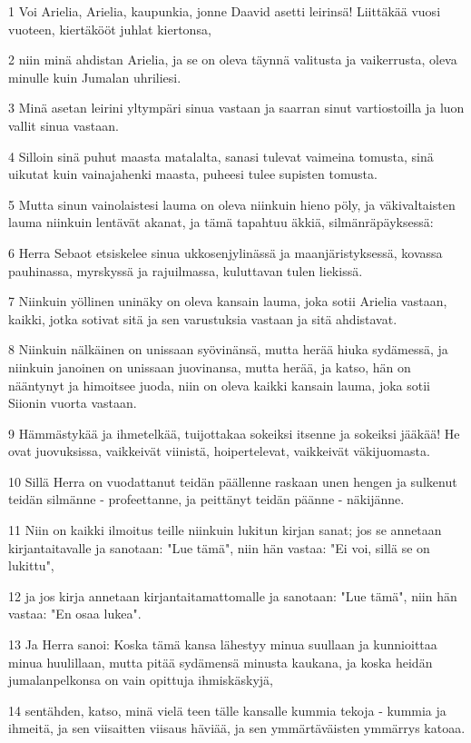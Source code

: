 \par 1 Voi Arielia, Arielia, kaupunkia, jonne Daavid asetti leirinsä! Liittäkää vuosi vuoteen, kiertäkööt juhlat kiertonsa,
\par 2 niin minä ahdistan Arielia, ja se on oleva täynnä valitusta ja vaikerrusta, oleva minulle kuin Jumalan uhriliesi.
\par 3 Minä asetan leirini yltympäri sinua vastaan ja saarran sinut vartiostoilla ja luon vallit sinua vastaan.
\par 4 Silloin sinä puhut maasta matalalta, sanasi tulevat vaimeina tomusta, sinä uikutat kuin vainajahenki maasta, puheesi tulee supisten tomusta.
\par 5 Mutta sinun vainolaistesi lauma on oleva niinkuin hieno pöly, ja väkivaltaisten lauma niinkuin lentävät akanat, ja tämä tapahtuu äkkiä, silmänräpäyksessä:
\par 6 Herra Sebaot etsiskelee sinua ukkosenjylinässä ja maanjäristyksessä, kovassa pauhinassa, myrskyssä ja rajuilmassa, kuluttavan tulen liekissä.
\par 7 Niinkuin yöllinen uninäky on oleva kansain lauma, joka sotii Arielia vastaan, kaikki, jotka sotivat sitä ja sen varustuksia vastaan ja sitä ahdistavat.
\par 8 Niinkuin nälkäinen on unissaan syövinänsä, mutta herää hiuka sydämessä, ja niinkuin janoinen on unissaan juovinansa, mutta herää, ja katso, hän on nääntynyt ja himoitsee juoda, niin on oleva kaikki kansain lauma, joka sotii Siionin vuorta vastaan.
\par 9 Hämmästykää ja ihmetelkää, tuijottakaa sokeiksi itsenne ja sokeiksi jääkää! He ovat juovuksissa, vaikkeivät viinistä, hoipertelevat, vaikkeivät väkijuomasta.
\par 10 Sillä Herra on vuodattanut teidän päällenne raskaan unen hengen ja sulkenut teidän silmänne - profeettanne, ja peittänyt teidän päänne - näkijänne.
\par 11 Niin on kaikki ilmoitus teille niinkuin lukitun kirjan sanat; jos se annetaan kirjantaitavalle ja sanotaan: "Lue tämä", niin hän vastaa: "Ei voi, sillä se on lukittu",
\par 12 ja jos kirja annetaan kirjantaitamattomalle ja sanotaan: "Lue tämä", niin hän vastaa: "En osaa lukea".
\par 13 Ja Herra sanoi: Koska tämä kansa lähestyy minua suullaan ja kunnioittaa minua huulillaan, mutta pitää sydämensä minusta kaukana, ja koska heidän jumalanpelkonsa on vain opittuja ihmiskäskyjä,
\par 14 sentähden, katso, minä vielä teen tälle kansalle kummia tekoja - kummia ja ihmeitä, ja sen viisaitten viisaus häviää, ja sen ymmärtäväisten ymmärrys katoaa.
